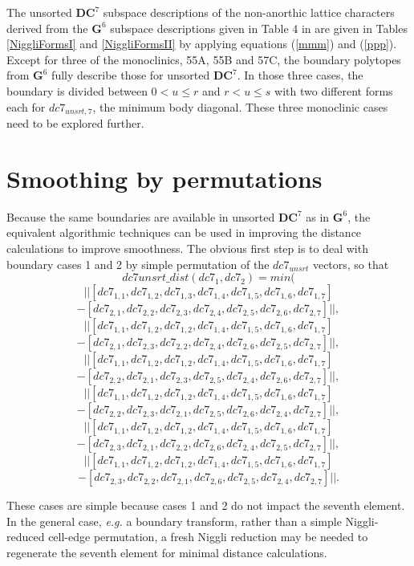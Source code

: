 \documentclass[preprint]{iucr}              %
\begin{document}
{The unsorted $\mathbf{DC}^7$ subspace descriptions of the 
non-anorthic lattice characters derived from the $\mathbf{G}^6$
subspace descriptions given in Table 4 in \cite{Andrews2014} are
given in Tables \ref{NiggliFormsI} and \ref{NiggliFormsII}  by applying equations (\ref{mmm}) and (\ref{ppp}).  Except for three
of the monoclinics, 55A, 55B and 57C, the boundary polytopes from
$\mathbf{G}^6$ fully describe those for unsorted $\mathbf{DC}^7$.
In those three cases, the boundary is divided between 
$0 < u \leq r$ and $r < u \leq s$ with two different forms each for
$dc7_{unsrt,7}$, the minimum body diagonal.  These three 
monoclinic cases need to be explored further.

\section{Smoothing by permutations}

Because the same boundaries are available in unsorted $\mathbf{DC}^7$ as
in $\mathbf{G}^6$, the equivalent algorithmic techniques can be used
in improving the distance calculations to improve smoothness.  The obvious
first step is to deal with boundary cases 1 and 2 by simple permutation
of the $dc7_{unsrt}$ vectors, so that
\[
  dc7unsrt\_dist(dc7_{1},dc7_{2})=min(
\]
\[
  ||[dc7_{1,1},dc7_{1,2},dc7_{1,3},dc7_{1,4},dc7_{1,5},dc7_{1,6},dc7_{1,7}]
\]
\[
  -[dc7_{2,1},dc7_{2,2},dc7_{2,3},dc7_{2,4},dc7_{2,5},dc7_{2,6},dc7_{2,7}]||,
\]
\[
  ||[dc7_{1,1},dc7_{1,2},dc7_{1,2},dc7_{1,4},dc7_{1,5},dc7_{1,6},dc7_{1,7}]
\]
\[
  -[dc7_{2,1},dc7_{2,3},dc7_{2,2},dc7_{2,4},dc7_{2,6},dc7_{2,5},dc7_{2,7}]||,
\]
\[
  ||[dc7_{1,1},dc7_{1,2},dc7_{1,2},dc7_{1,4},dc7_{1,5},dc7_{1,6},dc7_{1,7}]
\]
\[
  -[dc7_{2,2},dc7_{2,1},dc7_{2,3},dc7_{2,5},dc7_{2,4},dc7_{2,6},dc7_{2,7}]||,
\]
\[
  ||[dc7_{1,1},dc7_{1,2},dc7_{1,2},dc7_{1,4},dc7_{1,5},dc7_{1,6},dc7_{1,7}]
\]
\[
  -[dc7_{2,2},dc7_{2,3},dc7_{2,1},dc7_{2,5},dc7_{2,6},dc7_{2,4},dc7_{2,7}]||,
\]
\[
  ||[dc7_{1,1},dc7_{1,2},dc7_{1,2},dc7_{1,4},dc7_{1,5},dc7_{1,6},dc7_{1,7}]
\]
\[
  -[dc7_{2,3},dc7_{2,1},dc7_{2,2},dc7_{2,6},dc7_{2,4},dc7_{2,5},dc7_{2,7}]||,
\]
\[
  ||[dc7_{1,1},dc7_{1,2},dc7_{1,2},dc7_{1,4},dc7_{1,5},dc7_{1,6},dc7_{1,7}]
\]
\[
  -[dc7_{2,3},dc7_{2,2},dc7_{2,1},dc7_{2,6},dc7_{2,5},dc7_{2,4},dc7_{2,7}]||.
\]

These cases are simple because cases 1 and 2 do not impact the seventh element.
In the general case, {\it e.g.} a boundary transform, rather than a
simple Niggli-reduced cell-edge permutation, a fresh Niggli reduction may be needed to regenerate the
seventh element for minimal distance calculations.

}
\end{document}
